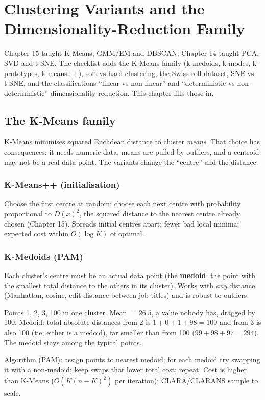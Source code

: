 \chapter{Clustering Variants and the Dimensionality-Reduction Family}

Chapter 15 taught K-Means, GMM/EM and DBSCAN; Chapter 14 taught PCA, SVD and t-SNE. The checklist adds the K-Means family (k-medoids, k-modes,
k-prototypes, k-means++), soft vs hard clustering, the Swiss roll dataset, SNE vs t-SNE, and the classifications ``linear vs non-linear'' and
``deterministic vs non-deterministic'' dimensionality reduction. This chapter fills those in.

\section{The K-Means family}
K-Means minimises squared Euclidean distance to cluster \emph{means}. That choice has consequences: it needs numeric data, means are pulled by outliers, and
a centroid may not be a real data point. The variants change the ``centre'' and the distance.

\subsection{K-Means++ (initialisation)}
Choose the first centre at random; choose each next centre with probability proportional to $D(x)^2$, the squared distance to the nearest centre already chosen
(Chapter 15). Spreads initial centres apart; fewer bad local minima; expected cost within $O(\log K)$ of optimal.

\subsection{K-Medoids (PAM)}
Each cluster's centre must be an actual data point (the \textbf{medoid}: the point with the smallest total distance to the others in its cluster). Works with
\emph{any} distance (Manhattan, cosine, edit distance between job titles) and is robust to outliers.
\begin{example}
Points 1, 2, 3, 100 in one cluster. Mean $= 26.5$, a value nobody has, dragged by 100. Medoid: total absolute distances from 2 is $1 + 0 + 1 + 98 = 100$ and from 3 is
also 100 (tie; either is a medoid), far smaller than from 100 ($99 + 98 + 97 = 294$). The medoid stays among the typical points.
\end{example}
Algorithm (PAM): assign points to nearest medoid; for each medoid try swapping it with a non-medoid; keep swaps that lower total cost; repeat. Cost is higher than
K-Means ($O(K(n-K)^2)$ per iteration); CLARA/CLARANS sample to scale.

